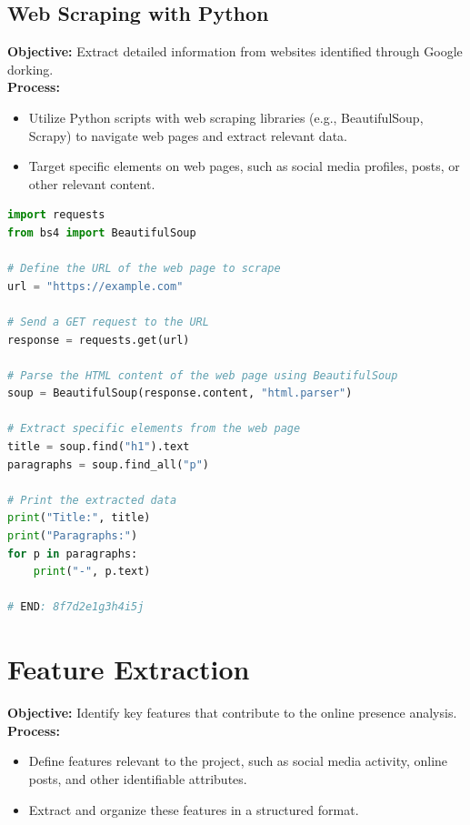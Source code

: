 \documentclass[openany]{report}
\begin{document}
\subsection{Web Scraping with Python}
\textbf{Objective:} Extract detailed information from websites identified through Google dorking.\\
\textbf{Process:}
\begin{itemize}
    \item Utilize Python scripts with web scraping libraries (e.g., BeautifulSoup, Scrapy) to navigate web pages and extract relevant data.
    \item Target specific elements on web pages, such as social media profiles, posts, or other relevant content.
\end{itemize}

\begin{lstlisting}[language=python, caption=Example on web scraping]
import requests
from bs4 import BeautifulSoup

# Define the URL of the web page to scrape
url = "https://example.com"

# Send a GET request to the URL
response = requests.get(url)

# Parse the HTML content of the web page using BeautifulSoup
soup = BeautifulSoup(response.content, "html.parser")

# Extract specific elements from the web page
title = soup.find("h1").text
paragraphs = soup.find_all("p")

# Print the extracted data
print("Title:", title)
print("Paragraphs:")
for p in paragraphs:
    print("-", p.text)

# END: 8f7d2e1g3h4i5j
\end{lstlisting}

\section{Feature Extraction}
\textbf{Objective:} Identify key features that contribute to the online presence analysis.\\
\textbf{Process:}
\begin{itemize}
    \item Define features relevant to the project, such as social media activity, online posts, and other identifiable attributes.
    \item Extract and organize these features in a structured format.
\end{itemize}
\end{document}
